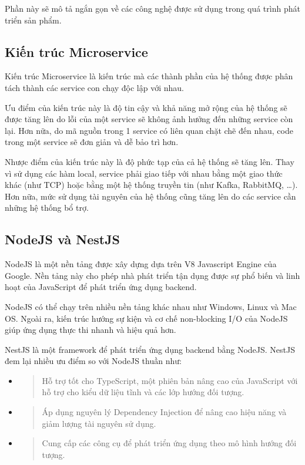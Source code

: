 \documentclass[./../main.tex]{subfiles}
\begin{document}
Phần này sẽ mô tả ngắn gọn về các công nghệ được sử dụng trong quá trình
phát triển sản phẩm.

\hypertarget{kiux1ebfn-truxfac-microservice}{%
\subsection{Kiến trúc
Microservice}\label{kiux1ebfn-truxfac-microservice}}

Kiến trúc Microservice là kiến trúc mà các thành phần của hệ thống được
phân tách thành các service con chạy độc lập với nhau.

Ưu điểm của kiến trúc này là độ tin cậy và khả năng mở rộng của hệ thống
sẽ được tăng lên do lỗi của một service sẽ không ảnh hưởng đến những
service còn lại. Hơn nữa, do mã nguồn trong 1 service có liên quan chặt
chẽ đến nhau, code trong một service sẽ đơn giản và dễ bảo trì hơn.

Nhược điểm của kiến trúc này là độ phức tạp của cả hệ thống sẽ tăng lên.
Thay vì sử dụng các hàm local, service phải giao tiếp với nhau bằng một
giao thức khác (như TCP) hoặc bằng một hệ thống truyền tin (như Kafka,
RabbitMQ, \ldots). Hơn nữa, mức sử dụng tài nguyên của hệ thống cũng
tăng lên do các service cần những hệ thống bổ trợ.

\hypertarget{nodejs-vuxe0-nestjs}{%
\subsection{NodeJS và NestJS}\label{nodejs-vuxe0-nestjs}}

NodeJS là một nền tảng được xây dựng dựa trên V8 Javascript Engine của
Google. Nền tảng này cho phép nhà phát triển tận dụng được sự phổ biến
và linh hoạt của JavaScript để phát triển ứng dụng backend.

NodeJS có thể chạy trên nhiều nền tảng khác nhau như Windows, Linux và
Mac OS. Ngoài ra, kiến trúc hướng sự kiện và cơ chế non-blocking I/O của
NodeJS giúp ứng dụng thực thi nhanh và hiệu quả hơn.

NestJS là một framework để phát triển ứng dụng backend bằng NodeJS.
NestJS đem lại nhiều ưu điểm so với NodeJS thuần như:

\begin{itemize}
\item
  \begin{quote}
  Hỗ trợ tốt cho TypeScript, một phiên bản nâng cao của JavaScript với
  hỗ trợ cho kiểu dữ liệu tĩnh và các lớp hướng đối tượng.
  \end{quote}
\item
  \begin{quote}
  Áp dụng nguyên lý Dependency Injection để nâng cao hiệu năng và giảm
  lượng tài nguyên sử dụng.
  \end{quote}
\item
  \begin{quote}
  Cung cấp các công cụ để phát triển ứng dụng theo mô hình hướng đối
  tượng.
  \end{quote}
\end{itemize}
\end{document}
